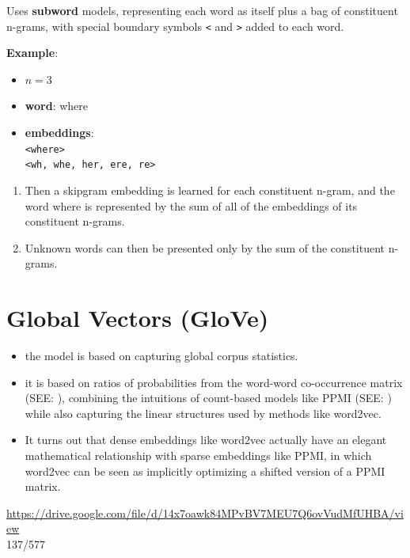 \vspace{0.2cm}
\noindent Uses \textbf{subword} models, representing each word as itself plus a bag of constituent n-grams, with special boundary symbols \texttt{<} and \texttt{>} added to each word.

\vspace{0.2cm}
\noindent\textbf{Example}:\\
\begin{itemize}
    \item $n=3$
    \item \textbf{word}: where
    \item \textbf{embeddings}: \\ \texttt{<where>} \\ \texttt{<wh, whe, her, ere, re>}
\end{itemize}

\begin{enumerate}
    \item Then a skipgram embedding is learned for each constituent n-gram, and the word where is represented by the sum of all of the embeddings of its constituent n-grams.
    
    \item Unknown words can then be presented only by the sum of the constituent n-grams.
\end{enumerate}



\section{Global Vectors (GloVe) \cite{nlp-1}}\label{Global Vectors (GloVe)}

\begin{itemize}
    \item the model is based on capturing global corpus statistics.

    \item it is based on ratios of probabilities from the word-word co-occurrence matrix (SEE: ), combining the intuitions of count-based models like PPMI (SEE: ) while also capturing the linear structures used by methods like word2vec.

    \item It turns out that dense embeddings like word2vec actually have an elegant mathematical relationship with sparse embeddings like PPMI, in which word2vec can be seen as implicitly optimizing a shifted version of a PPMI matrix.
\end{itemize}






\vspace{4cm}
\url{https://drive.google.com/file/d/14x7oawk84MPvBV7MEU7Q6ovVudMfUHBA/view}\\
137/577



